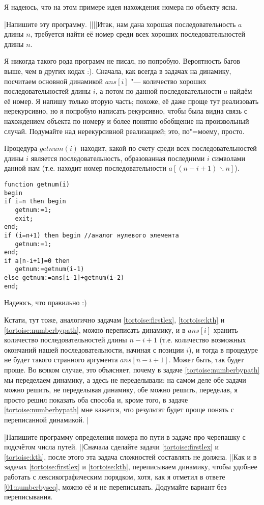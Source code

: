 Я надеюсь, что на этом примере идея нахождения номера по объекту ясна. 

\task|Напишите эту программу.
||||Итак, нам дана хорошая последовательность $a$ длины $n$, требуется найти её номер среди всех хороших 
последовательностей длины $n$.

Я никогда такого рода программ не писал, но попробую. Вероятность багов выше, чем в других 
кодах :). Сначала, как всегда в задачах на динамику, посчитаем основной динамикой $ans[i]$ "--- 
количество хороших последовательностей длины $i$, а потом по данной последовательности $a$ найдём 
её номер. Я напишу только вторую часть; похоже, её даже проще тут реализовать нерекурсивно, но я 
попробую написать рекурсивно, чтобы была видна связь с нахождением объекта по номеру и более 
понятно обобщение на произвольный случай. Подумайте над нерекурсивной реализацией; это, по"=моему, просто.

Процедура $getnum(i)$ находит, какой по счету среди всех последовательностей длины $i$ является 
последовательность, образованная последними $i$ символами данной нам (т.е. находит номер 
последовательности $a[(n-i+1)\ddots n]$).
\begin{codesampleo}\begin{verbatim}
function getnum(i)
begin
if i=n then begin
   getnum:=1;
   exit;
end;
if (i=n+1) then begin //аналог нулевого элемента
   getnum:=1;
end;
if a[n-i+1]=0 then
   getnum:=getnum(i-1)
else getnum:=ans[i-1]+getnum(i-2)
end;
\end{verbatim}\end{codesampleo}
Надеюсь, что правильно :)

Кстати, тут тоже, аналогично задачам \ref{tortoise:firstlex}, \ref{tortoise:kth} и 
\ref{tortoise:numberbypath}, можно переписать динамику, и в $ans[i]$ хранить количество 
последовательностей длины $n-i+1$ (т.е. количество возможных окончаний нашей последовательности, 
начиная с позиции $i$), и тогда в процедуре не будет такого странного аргумента $ans[n-i+1]$. Может 
быть, так будет проще. Во всяком случае, это объясняет, почему в задаче 
\ref{tortoise:numberbypath} мы переделаем динамику, а здесь не переделывали: на самом деле 
обе задачи можно решить, не переделывая динамику, обе можно решить, переделав, я просто решил 
показать оба способа и, кроме того, в задаче \ref{tortoise:numberbypath} мне кажется, что результат 
будет проще понять с переписанной динамикой.
|\label{01:numberbyseq}

\task|Напишите программу определения номера по пути в задаче про черепашку с подсчётом числа путей.
||Сначала сделайте задачи \ref{tortoise:firstlex} и \ref{tortoise:kth}, после этого эта задача 
сложностей составлять не должна.
||Как и в задачах \ref{tortoise:firstlex} и \ref{tortoise:kth}, переписываем динамику, чтобы 
удобнее работать с лексикографическим порядком, хотя, как я отметил в ответе \ref{01:numberbyseq}, 
можно её и не переписывать. Додумайте вариант без переписывания.


